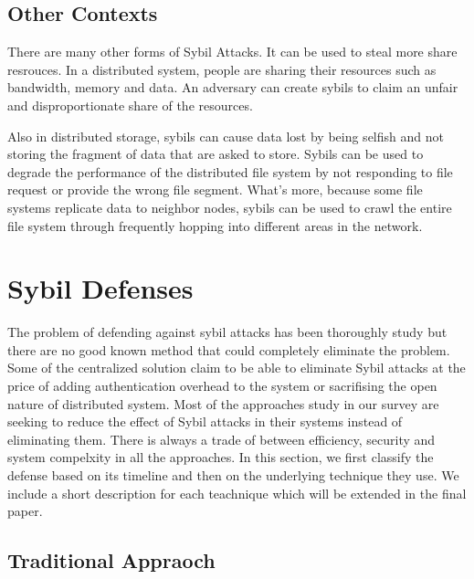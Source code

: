 \documentclass[conference]{IEEEtran}
\begin{document}
\subsection{Other Contexts}
There are many other forms of Sybil Attacks. It can be used to steal more share resrouces.
In a distributed system, people are sharing their resources such as bandwidth, memory and data. An adversary can create sybils to claim an unfair and disproportionate share of the resources. 

Also in distributed storage, sybils can cause data lost by being selfish and not storing the fragment of data that are asked to store. Sybils can be used to degrade the performance of the distributed file system by not responding to file request or provide the wrong file segment. What's more, because some file systems replicate data to neighbor nodes, sybils can be used to crawl the entire file system through frequently hopping into different areas in the network.\cite{Lian07anempirical}\cite{wolchok09defeatingvanish}


\section{Sybil Defenses}
The problem of defending against sybil attacks has been thoroughly study but there are no good known method that could completely eliminate the problem. Some of the centralized solution claim to be able to eliminate Sybil attacks at the price of adding authentication overhead to the system or sacrifising the open nature of distributed system. Most of the approaches study in our survey are seeking to reduce the effect of Sybil attacks in their systems instead of eliminating them. There is always a trade of between efficiency, security and system compelxity in all the approaches. In this section, we first classify the defense based on its timeline and then on the underlying technique they use. We include a short description for each teachnique which will be extended in the final paper.

\subsection{Traditional Appraoch}
\end{document}
